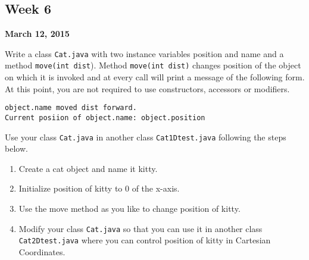 \documentclass[12pt,letterpaper,twoside]{article}
\begin{document}


\subsection*{Week 6}
\hfill \textbf{March 12, 2015}

Write a class \texttt{Cat.java} with two instance variables position and name and a method \texttt{move(int dist}). Method \texttt{move(int dist)} changes position of the object on which it is invoked and at every call will print a message of the following form. At this point, you are not required to use constructors, accessors or modifiers.

\begin{verbatim}
object.name moved dist forward.
Current posiion of object.name: object.position
\end{verbatim}

Use your class \texttt{Cat.java} in another class \texttt{Cat1Dtest.java} following the steps below.

\begin{enumerate}[itemsep=0pt]
\item Create a cat object and name it kitty.
\item Initialize position of kitty to 0 of the x-axis.
\item Use the move method as you like to change position of kitty.
\item Modify your class \texttt{Cat.java} so that you can use it in another class \texttt{Cat2Dtest.java} where you can control position of kitty in Cartesian Coordinates.
\end{enumerate}
\end{document}

